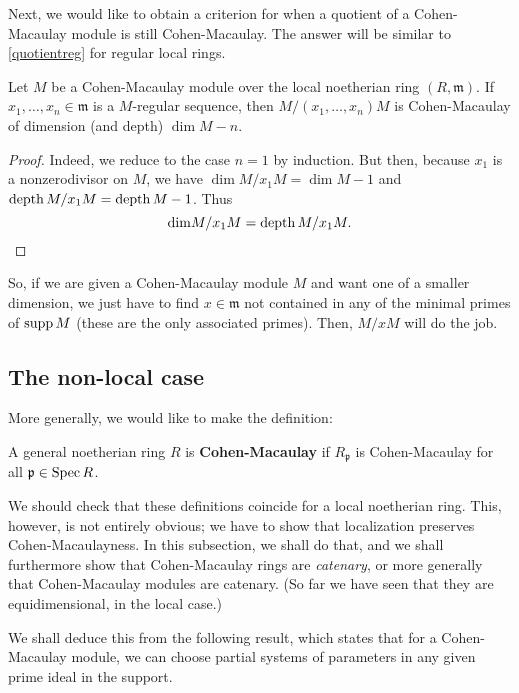Next, we would like to obtain a criterion for when a quotient of a
Cohen-Macaulay module is still Cohen-Macaulay.
The answer will be similar to \cref{quotientreg} for regular local rings.

\begin{proposition} \label{quotientCM}
Let $M$ be a Cohen-Macaulay module over the local noetherian ring $(R,
\mathfrak{m})$. If $x_1, \dots, x_n \in \mathfrak{m}$ is a $M$-regular
sequence, then $M/(x_1, \dots, x_n)M$ is Cohen-Macaulay of dimension (and
depth) $\dim M - n$. 
\end{proposition} 
\begin{proof} 
Indeed, we reduce to the case $n=1$ by induction.
But then, because $x_1$ is a nonzerodivisor on $M$, we have $\dim
M/x_1 M = \dim M -1$ and $\operatorname{depth} M/x_1 M = \operatorname{depth} M -1$. Thus 
\[ \mathrm{dim} M/x_1 M = \operatorname{depth} M/x_1M.  \]
\end{proof} 

So, if we are given a Cohen-Macaulay module $M$ and want one of a smaller
dimension, we just have to find $x \in \mathfrak{m}$ not contained in any of
the minimal primes of $\operatorname{supp} M$ (these are the only associated primes). Then,
$M/xM$ will do the job.

\subsection{The non-local case}

More generally, we would like to make the definition:
\begin{definition} \label{generalCM}
 A general noetherian ring $R$ is
\textbf{Cohen-Macaulay} if
$R_{\mathfrak{p}}$ is Cohen-Macaulay for all $\mathfrak{p} \in
\operatorname{Spec} R$.
\end{definition}

We should check that these definitions coincide for a local noetherian ring. 
This, however, is not entirely obvious; we have to show that localization
preserves Cohen-Macaulayness.
In this subsection, we shall do that, and we shall furthermore show that Cohen-Macaulay rings are \emph{catenary}, or
more generally that Cohen-Macaulay modules are catenary. (So far we have
seen that they are equidimensional, in the local case.)


We shall deduce this from the following result, which states that for a
Cohen-Macaulay module, we can choose partial systems of parameters in any
given prime ideal in the support.

